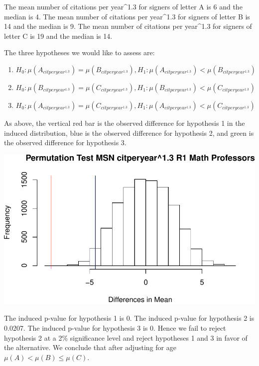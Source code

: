 \documentclass[]{article}
\begin{document}
The mean number of citations per year\^{}1.3 for signers of letter A is
6 and the median is 4. The mean number of citations per year\^{}1.3 for
signers of letter B is 14 and the median is 9. The mean number of
citations per year\^{}1.3 for signers of letter C is 19 and the median
is 14.

The three hypotheses we would like to assess are:

\begin{enumerate}
\def\labelenumi{\arabic{enumi}.}
\item
  \(H_0: \mu(A_{citperyear^{1.3}}) = \mu(B_{citperyear^{1.3}}), H_1: \mu(A_{citperyear^{1.3}}) < \mu(B_{citperyear^{1.3}})\)
\item
  \(H_0: \mu(B_{citperyear^{1.3}}) = \mu(C_{citperyear^{1.3}}), H_1: \mu(B_{citperyear^{1.3}}) < \mu(C_{citperyear^{1.3}})\)
\item
  \(H_0: \mu(A_{citperyear^{1.3}}) = \mu(C_{citperyear^{1.3}}), H_1: \mu(A_{citperyear^{1.3}}) < \mu(C_{citperyear^{1.3}})\)
\end{enumerate}

As above, the vertical red bar is the observed difference for hypothesis
1 in the induced distribution, blue is the observed difference for
hypothesis 2, and green is the observed difference for hypothesis 3.

\includegraphics{Response_files/figure-latex/unnamed-chunk-34-1.pdf}

The induced p-value for hypothesis 1 is 0. The induced p-value for
hypothesis 2 is 0.0207. The induced p-value for hypothesis 3 is 0. Hence
we fail to reject hypothesis 2 at a 2\% significance level and reject
hypotheses 1 and 3 in favor of the alternative. We conclude that after
adjusting for age \(\mu(A) < \mu(B) \leq \mu(C)\).
\end{document}
